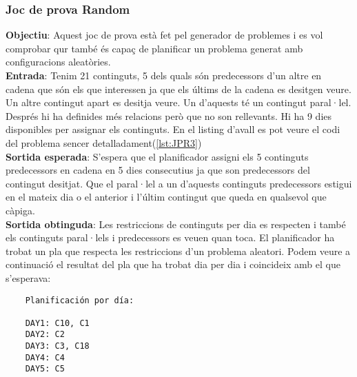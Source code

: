 \documentclass[a4paper]{article}
\begin{document}
	\subsubsection{Joc de prova Random}
	\textbf{Objectiu}: Aquest joc de prova està fet pel generador de problemes i es vol comprobar qur també és capaç de planificar un problema generat amb configuracions aleatòries.\\
	\textbf{Entrada}: Tenim 21 continguts, 5 dels quals són predecessors d'un altre en cadena que són els que interessen ja que els últims de la cadena es desitgen veure. Un altre contingut apart es desitja veure. Un d'aquests té un contingut paral·lel. Després hi ha definides més relacions però que no son rellevants. Hi ha 9 dies disponibles per assignar els continguts. En el listing d'avall es pot veure el codi del problema sencer detalladament(\ref{lst:JPR3})\\
	\textbf{Sortida esperada}: S'espera que el planificador assigni els 5 continguts predecessors en cadena en 5 dies consecutius ja que son predecessors del contingut desitjat. Que el paral·lel a un d'aquests continguts predecessors estigui en el mateix dia o el anterior i l'últim contingut que queda en qualsevol que càpiga. \\
	\textbf{Sortida obtinguda}: Les restriccions de continguts per dia es respecten i també els continguts paral·lels i predecessors es veuen quan toca. El planificador ha trobat un pla que respecta les restriccions d'un problema aleatori.  Podem veure a continuació el resultat del pla que ha trobat dia per dia i coincideix amb el que s'esperava:\\
	
	\begin{verbatim}
	Planificación por día:
	
	DAY1: C10, C1
	DAY2: C2
	DAY3: C3, C18
	DAY4: C4
	DAY5: C5
	\end{verbatim}
	
\end{document}
